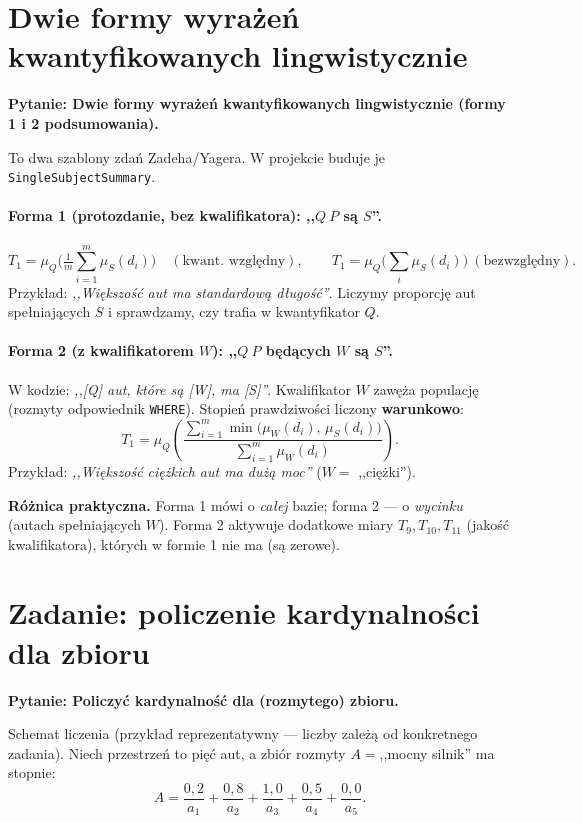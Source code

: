 \documentclass[11pt]{article}
\newcommand{\code}[1]{\texttt{#1}}
\newcommand{\pyt}[1]{\medskip\noindent\textbf{\textcolor{mkbg}{Pytanie:} #1}\par\smallskip}
\begin{document}
\section{Dwie formy wyrażeń kwantyfikowanych lingwistycznie}
\label{sec:forms}

\pyt{Dwie formy wyrażeń kwantyfikowanych lingwistycznie (formy 1 i 2 podsumowania).}

To dwa szablony zdań Zadeha/Yagera. W projekcie buduje je \code{SingleSubjectSummary}.

\paragraph{Forma 1 (protozdanie, bez kwalifikatora): ,,$Q\ P$ są $S$''.}
\[
  T_1 = \mu_Q\!\Big(\tfrac{1}{m}\textstyle\sum_{i=1}^m \mu_S(d_i)\Big)
  \quad(\text{kwant. względny}),\qquad
  T_1 = \mu_Q\!\big(\textstyle\sum_i \mu_S(d_i)\big)\ (\text{bezwzględny}).
\]
Przykład: \emph{,,Większość aut ma standardową długość''}. Liczymy proporcję aut
spełniających $S$ i sprawdzamy, czy trafia w kwantyfikator $Q$.

\paragraph{Forma 2 (z kwalifikatorem $W$): ,,$Q\ P$ będących $W$ są $S$''.}
W kodzie: \emph{,,[Q] aut, które są [W], ma [S]''}. Kwalifikator $W$ zawęża populację
(rozmyty odpowiednik \code{WHERE}). Stopień prawdziwości liczony \textbf{warunkowo}:
\[
  T_1 = \mu_Q\!\left(\frac{\sum_{i=1}^m \min\big(\mu_W(d_i),\,\mu_S(d_i)\big)}
                          {\sum_{i=1}^m \mu_W(d_i)}\right).
\]
Przykład: \emph{,,Większość ciężkich aut ma dużą moc''} ($W=$ ,,ciężki'').

\textbf{Różnica praktyczna.} Forma 1 mówi o \emph{całej} bazie; forma 2 --- o
\emph{wycinku} (autach spełniających $W$). Forma 2 aktywuje dodatkowe miary $T_9,T_{10},
T_{11}$ (jakość kwalifikatora), których w formie 1 nie ma (są zerowe).

\section{Zadanie: policzenie kardynalności dla zbioru}

\pyt{Policzyć kardynalność dla (rozmytego) zbioru.}

Schemat liczenia (przykład reprezentatywny --- liczby zależą od konkretnego zadania).
Niech przestrzeń to pięć aut, a zbiór rozmyty $A=$,,mocny silnik'' ma stopnie:
\[
  A = \frac{0{,}2}{a_1} + \frac{0{,}8}{a_2} + \frac{1{,}0}{a_3} + \frac{0{,}5}{a_4}
      + \frac{0{,}0}{a_5}.
\]
\end{document}
